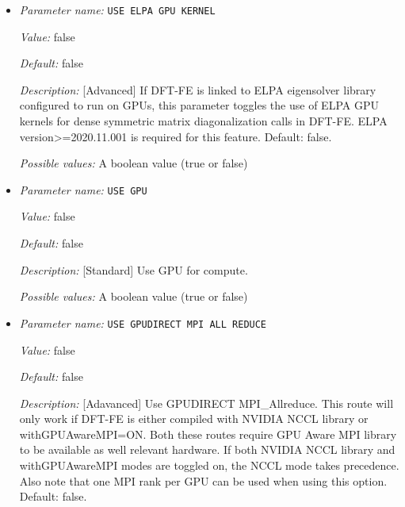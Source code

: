 \begin{itemize}
{\it Default:} true


{\it Description:} [Developer] Option to use full NxN memory on CPU in subspace rotation and when mixed precision optimization is not being used. This reduces the number of MPI_Allreduce communication calls. Default: true.


{\it Possible values:} A boolean value (true or false)
\item {\it Parameter name:} {\tt USE ELPA GPU KERNEL}
\label{parameters:GPU/USE ELPA GPU KERNEL}
\label{parameters:GPU/USE_20ELPA_20GPU_20KERNEL}


{\it Value:} false


{\it Default:} false


{\it Description:} [Advanced] If DFT-FE is linked to ELPA eigensolver library configured to run on GPUs, this parameter toggles the use of ELPA GPU kernels for dense symmetric matrix diagonalization calls in DFT-FE. ELPA version>=2020.11.001 is required for this feature. Default: false.


{\it Possible values:} A boolean value (true or false)
\item {\it Parameter name:} {\tt USE GPU}
\label{parameters:GPU/USE GPU}
\label{parameters:GPU/USE_20GPU}


{\it Value:} false


{\it Default:} false


{\it Description:} [Standard] Use GPU for compute.


{\it Possible values:} A boolean value (true or false)
\item {\it Parameter name:} {\tt USE GPUDIRECT MPI ALL REDUCE}
\label{parameters:GPU/USE GPUDIRECT MPI ALL REDUCE}
\label{parameters:GPU/USE_20GPUDIRECT_20MPI_20ALL_20REDUCE}


{\it Value:} false


{\it Default:} false


{\it Description:} [Adavanced] Use GPUDIRECT MPI_Allreduce. This route will only work if DFT-FE is either compiled with NVIDIA NCCL library or withGPUAwareMPI=ON. Both these routes require GPU Aware MPI library to be available as well relevant hardware. If both NVIDIA NCCL library and withGPUAwareMPI modes are toggled on, the NCCL mode takes precedence. Also note that one MPI rank per GPU can be used when using this option. Default: false.



\end{itemize}
